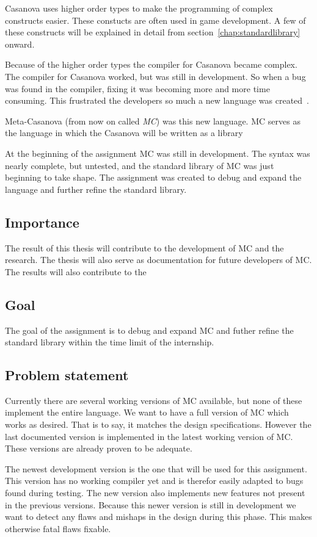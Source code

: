 Casanova uses higher order types to make the programming of complex constructs easier.
These constucts are often used in game development.
A few of these constructs will be explained in detail from section~\ref{chap:standardlibrary} onward.

Because of the higher order types the compiler for Casanova became complex.
The compiler for Casanova worked, but was still in development.
So when a bug was found in the compiler, fixing it was becoming more and more time consuming.
This frustrated the developers so much a new language was created~\cite{giuseppe2015mc}.

Meta-Casanova (from now on called \emph{MC}) was this new language.
MC serves as the language in which the Casanova will be written as a library

At the beginning of the assignment MC was still in development.
The syntax was nearly complete, but untested, and the standard library of MC was just beginning to take shape.
The assignment was created to debug and expand the language and further refine the standard library.


\subsection{Importance}
The result of this thesis will contribute to the development of MC and the research.
The thesis will also serve as documentation for future developers of MC.
The results will also contribute to the

\subsection{Goal}\label{sec:goalsmandate}
The goal of the assignment is to debug and expand MC and futher refine the standard library within the time limit of the internship.

\subsection{Problem statement}
Currently there are several working versions of MC available, but none of these implement the entire language.
We want to have a full version of MC which works as desired.
That is to say, it matches the design specifications.
However the last documented version is implemented in the latest working version of MC.
These versions are already proven to be adequate\cite{giuseppe2015mc}.

The newest development version is the one that will be used for this assignment.
This version has no working compiler yet and is therefor easily adapted to bugs found during testing.
The new version also implements new features not present in the previous versions.
Because this newer version is still in development we want to detect any flaws and mishaps in the design during this phase.
This makes otherwise fatal flaws fixable.

